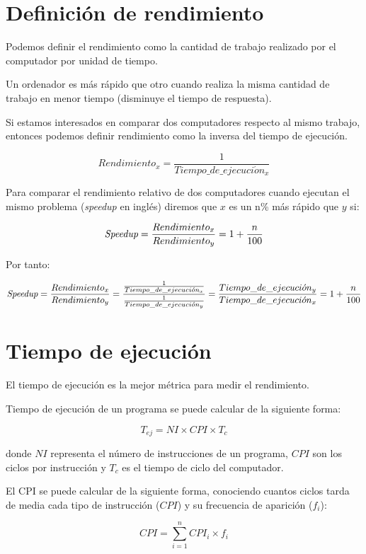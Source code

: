 \documentclass[12pt,onecolumn]{memoir}
\begin{document}
\section{Definición de rendimiento}

Podemos definir el rendimiento como la cantidad de trabajo realizado
por el computador por unidad de tiempo.

Un ordenador es más rápido que otro cuando realiza la misma cantidad
de trabajo en menor tiempo (disminuye el tiempo de respuesta).

Si estamos interesados en comparar dos computadores respecto al mismo
trabajo, entonces podemos definir rendimiento como la inversa del
tiempo de ejecución.

\[ Rendimiento_{x} = \frac{1}{Tiempo\_de\_ejecuci\acute{o}n_{x}} \]

Para comparar el rendimiento relativo de dos computadores cuando
ejecutan el mismo problema (\emph{speedup} en inglés) diremos que $x$ es un
n\% más rápido que $y$ si:

\[ \emph{Speedup} = \frac{Rendimiento_{x}}{Rendimiento_{y}} = 1 + \frac{n}{100} \]

Por tanto:

\[ \emph{Speedup} = \frac{Rendimiento_{x}}{Rendimiento_{y}} =
\frac{\frac{1}{Tiempo\_de\_ejecuci\acute{o}n_{x}}}{\frac{1}{Tiempo\_de\_ejecuci\acute{o}n_{y}}}
= \frac{Tiempo\_de\_ejecuci\acute{o}n_{y}}{Tiempo\_de\_ejecuci\acute{o}n_{x}} = 1 + \frac{n}{100}\]

\section{Tiempo de ejecución}

El tiempo de ejecución es la mejor métrica para medir el rendimiento.

Tiempo de ejecución de un programa se puede calcular de la siguiente forma:

\[ T_{ej} = NI \times CPI \times T_{c} \]

donde $NI$ representa el número de instrucciones de un programa, $CPI$
son los ciclos por instrucción y $T_{c}$ es el tiempo de ciclo del
computador.

El CPI se puede calcular de la siguiente forma, conociendo cuantos
ciclos tarda de media cada tipo de instrucción ($CPI$) y su frecuencia de
aparición ($f_i$):

\[ CPI = \sum_{i=1}^{n} CPI_i \times f_i \]
\end{document}
